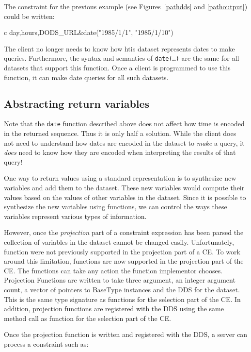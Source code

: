 \documentclass[12pt]{article}
\begin{document}
The constraint for the previous example (see Figures~\ref{pathdds} and
\ref{pathoutput}) could be written:

\begin{code}{c}
  day,hours,DODS_URL&date("1985/1/1", "1985/1/10")
\end{code}

The client no longer needs to know how htis dataset represents dates to make
queries. Furthermore, the syntax and semantics of {\tt date(\ldots)} are the
same for all datasets that support this function. Once a client is programmed
to use this function, it can make date queries for all such datasets.

\subsection{Abstracting return variables}

Note that the {\tt date} function described above does not affect how time is
encoded in the returned sequence.  Thus it is only half a solution. While the
client does not need to understand how dates are encoded in the dataset to
{\em make} a query, it {\em does} need to know how they are encoded when
interpreting the results of that query!

One way to return values using a standard representation is to synthesize new
variables and add them to the dataset. These new variables would compute
their values based on the values of other variables in the dataset. Since it
is possible to synthesize the new variables using functions, we can control
the ways these variables represent various types of information.

However, once the \emph{projection} part of a constraint expression has been
parsed the collection of variables in the dataset cannot be changed easily.
Unfortunately, function were not previously supported in the projection part
of a CE. To work around this limitation, functions are now supported in the
projection part of the CE. The functions can take any action the function
implementor chooses. Projection Functions are written to take three argument,
an integer argument count, a vector of pointers to BaseType instances and the
DDS for the dataset. This is the same type signature as functions for the
selection part of the CE. In addition, projection functions are registered
with the DDS using the same method call as function for the selection part of
the CE.

Once the projection function is written and registered with the DDS, a server
can process a constraint such as:
\end{document}
